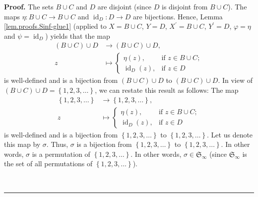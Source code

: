 \documentclass[numbers=enddot,12pt,final,onecolumn,notitlepage]{scrartcl}%
\theoremstyle{definition}
\newenvironment{proof}[1][Proof]{\noindent\textbf{#1.} }{\ \rule{0.5em}{0.5em}}
\newenvironment{verlong}{}{}
\begin{document}
\begin{verlong}
\begin{proof}
The sets $B\cup C$ and $D$ are disjoint (since $D$ is disjoint from $B\cup
C$). The maps $\eta:B\cup C\rightarrow B\cup C$ and $\operatorname*{id}%
\nolimits_{D}:D\rightarrow D$ are bijections. Hence, Lemma
\ref{lem.proofs.Sinf-glue1} (applied to $X=B\cup C$, $Y=D$, $X^{\prime}=B\cup
C$, $Y^{\prime}=D$, $\varphi=\eta$ and $\psi=\operatorname*{id}\nolimits_{D}$)
yields that the map%
\begin{align*}
\left(  B\cup C\right)  \cup D  &  \rightarrow\left(  B\cup C\right)  \cup
D,\\
z  &  \mapsto%
\begin{cases}
\eta\left(  z\right)  , & \text{if }z\in B\cup C;\\
\operatorname*{id}\nolimits_{D}\left(  z\right)  , & \text{if }z\in D
\end{cases}
\end{align*}
is well-defined and is a bijection from $\left(  B\cup C\right)  \cup D$ to
$\left(  B\cup C\right)  \cup D$. In view of $\left(  B\cup C\right)  \cup
D=\left\{  1,2,3,\ldots\right\}  $, we can restate this result as follows: The
map%
\begin{align*}
\left\{  1,2,3,\ldots\right\}   &  \rightarrow\left\{  1,2,3,\ldots\right\}
,\\
z  &  \mapsto%
\begin{cases}
\eta\left(  z\right)  , & \text{if }z\in B\cup C;\\
\operatorname*{id}\nolimits_{D}\left(  z\right)  , & \text{if }z\in D
\end{cases}
\end{align*}
is well-defined and is a bijection from $\left\{  1,2,3,\ldots\right\}  $ to
$\left\{  1,2,3,\ldots\right\}  $. Let us denote this map by $\sigma$. Thus,
$\sigma$ is a bijection from $\left\{  1,2,3,\ldots\right\}  $ to $\left\{
1,2,3,\ldots\right\}  $. In other words, $\sigma$ is a permutation of
$\left\{  1,2,3,\ldots\right\}  $. In other words, $\sigma\in\mathfrak{S}%
_{\infty}$ (since $\mathfrak{S}_{\infty}$ is the set of all permutations of
$\left\{  1,2,3,\ldots\right\}  $).


\end{proof}
\end{verlong}
\end{document}
